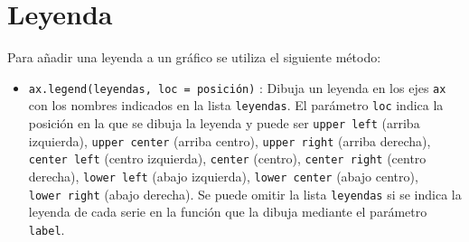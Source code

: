 \documentclass[
  spanish,
  a4paper,
]{scrreport}
\providecommand{\tightlist}{%
  \setlength{\itemsep}{0pt}\setlength{\parskip}{0pt}}
\begin{document}
\section{Leyenda}\label{leyenda}

Para añadir una leyenda a un gráfico se utiliza el siguiente método:

\begin{itemize}
\tightlist
\item
  \texttt{ax.legend(leyendas,\ loc\ =\ posición)} : Dibuja un leyenda en
  los ejes \texttt{ax} con los nombres indicados en la lista
  \texttt{leyendas}. El parámetro \texttt{loc} indica la posición en la
  que se dibuja la leyenda y puede ser
  \texttt{\textquotesingle{}upper\ left\textquotesingle{}} (arriba
  izquierda), \texttt{\textquotesingle{}upper\ center\textquotesingle{}}
  (arriba centro),
  \texttt{\textquotesingle{}upper\ right\textquotesingle{}} (arriba
  derecha), \texttt{\textquotesingle{}center\ left\textquotesingle{}}
  (centro izquierda),
  \texttt{\textquotesingle{}center\textquotesingle{}} (centro),
  \texttt{\textquotesingle{}center\ right\textquotesingle{}} (centro
  derecha), \texttt{\textquotesingle{}lower\ left\textquotesingle{}}
  (abajo izquierda),
  \texttt{\textquotesingle{}lower\ center\textquotesingle{}} (abajo
  centro), \texttt{\textquotesingle{}lower\ right\textquotesingle{}}
  (abajo derecha). Se puede omitir la lista \texttt{leyendas} si se
  indica la leyenda de cada serie en la función que la dibuja mediante
  el parámetro \texttt{label}.
\end{itemize}
\end{document}
